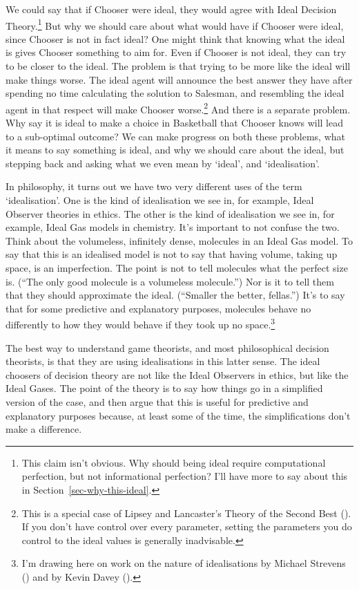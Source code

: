 \documentclass[
  12pt,
  letterpaper,
  DIV=11,
  numbers=noendperiod]{scrreprt}
\begin{document}
We could say that if Chooser were ideal, they would agree with Ideal
Decision Theory.\footnote{This claim isn't obvious. Why should being
  ideal require computational perfection, but not informational
  perfection? I'll have more to say about this in
  Section~\ref{sec-why-this-ideal}.} But why we should care about what
would have if Chooser were ideal, since Chooser is not in fact ideal?
One might think that knowing what the ideal is gives Chooser something
to aim for. Even if Chooser is not ideal, they can try to be closer to
the ideal. The problem is that trying to be more like the ideal will
make things worse. The ideal agent will announce the best answer they
have after spending no time calculating the solution to Salesman, and
resembling the ideal agent in that respect will make Chooser
worse.\footnote{This is a special case of Lipsey and Lancaster's Theory
  of the Second Best (). If you don't have control over every parameter,
  setting the parameters you do control to the ideal values is generally
  inadvisable.} And there is a separate problem. Why say it is ideal to
make a choice in Basketball that Chooser knows will lead to a
sub-optimal outcome? We can make progress on both these problems, what
it means to say something is ideal, and why we should care about the
ideal, but stepping back and asking what we even mean by `ideal', and
`idealisation'.

In philosophy, it turns out we have two very different uses of the term
`idealisation'. One is the kind of idealisation we see in, for example,
Ideal Observer theories in ethics. The other is the kind of idealisation
we see in, for example, Ideal Gas models in chemistry. It's important to
not confuse the two. Think about the volumeless, infinitely dense,
molecules in an Ideal Gas model. To say that this is an idealised model
is not to say that having volume, taking up space, is an imperfection.
The point is not to tell molecules what the perfect size is. (``The only
good molecule is a volumeless molecule.'') Nor is it to tell them that
they should approximate the ideal. (``Smaller the better, fellas.'')
It's to say that for some predictive and explanatory purposes, molecules
behave no differently to how they would behave if they took up no
space.\footnote{I'm drawing here on work on the nature of idealisations
  by Michael Strevens () and by Kevin
  Davey ().}

The best way to understand game theorists, and most philosophical
decision theorists, is that they are using idealisations in this latter
sense. The ideal choosers of decision theory are not like the Ideal
Observers in ethics, but like the Ideal Gases. The point of the theory
is to say how things go in a simplified version of the case, and then
argue that this is useful for predictive and explanatory purposes
because, at least some of the time, the simplifications don't make a
difference.
\end{document}
